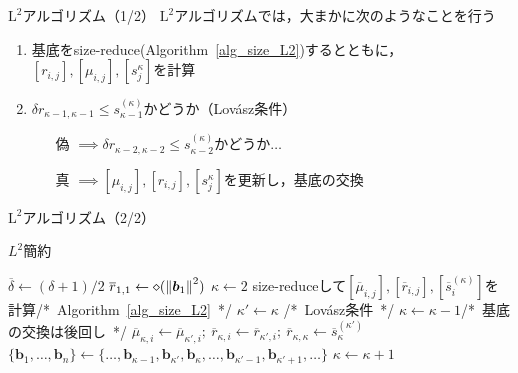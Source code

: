 \documentclass[12pt,aspectratio=169,table,dvipdfmx, leqno]{beamer}
\renewcommand{\Comment}[1]{\quad/*~#1~*/}
\begin{document}
\begin{frame}{$\text{L}^2$アルゴリズム（1/2）}
$\text{L}^2$アルゴリズムでは，大まかに次のようなことを行う
\begin{enumerate}
    \item 基底をsize-reduce(Algorithm~\ref{alg_size_L2})するとともに，$[r_{i, j}], [\mu_{i, j}], [s_j^{\kappa}]$を計算
    \item $\delta r_{\kappa-1, \kappa-1}\le s_{\kappa-1}^{(\kappa)}$かどうか（Lov\'asz条件）
    \begin{itemize}
        \item[偽] $\implies$$\delta r_{\kappa-2, \kappa-2}\le s_{\kappa-2}^{(\kappa)}$かどうか$\ldots$
        \item[真] $\implies$$[\mu_{i, j}], [r_{i, j}], [s_j^{\kappa}]$を更新し，基底の交換 
    \end{itemize}
\end{enumerate}
\end{frame}

\begin{frame}{$\text{L}^2$アルゴリズム（2/2）}
\begin{algorithm}[H]
    \footnotesize
    \begin{algorithmic}[1]
        \caption{\footnotesize $L^2$簡約\cite{NS05}}
        \label{alg_L2}
        \State $\overline{\delta}\gets(\delta+1)/2$
        \State $\overline{r}_{1,1}\gets\diamond(\norm{\bm{b}_1}^2)$
        \State $\kappa\gets 2$
            \State size-reduceして$[\overline{\mu}_{i, j}], [\overline{r}_{i, j}], [\overline{s}_{i}^{(\kappa)}]$を計算\Comment{Algorithm~\ref{alg_size_L2}}
            \State $\kappa'\gets\kappa$
            \Comment{Lov\'asz条件}
                \State $\kappa\gets\kappa-1$\Comment{基底の交換は後回し}
            \EndWhile
                \State $\overline{\mu}_{\kappa, i}\gets\overline{\mu}_{\kappa', i};~\overline{r}_{\kappa, i}\gets\overline{r}_{\kappa', i};~\overline{r}_{\kappa, \kappa}\gets\overline{s}_{\kappa}^{(\kappa')}$
            \EndFor
            \State $\{\bm{b}_1,\ldots,\bm{b}_n\}\gets\{\ldots,\bm{b}_{\kappa-1}, \bm{b}_{\kappa'}, \bm{b}_{\kappa},\ldots,\bm{b}_{\kappa'-1},\bm{b}_{\kappa'+1},\ldots\}$%
            \State $\kappa\gets \kappa+1$
        \EndWhile
    \end{algorithmic}
\end{algorithm}
\end{frame}
\end{document}
